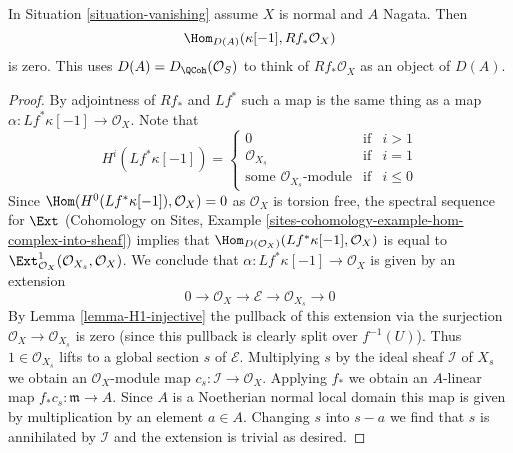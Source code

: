 \begin{lemma}
\label{lemma-R1-injective}
In Situation \ref{situation-vanishing} assume $X$ is normal and $A$ Nagata.
Then
$$
\Hom_{D(A)}(\kappa[-1], Rf_*\mathcal{O}_X)
$$
is zero. This uses $D(A) = D_\QCoh(\mathcal{O}_S)$ to think of
$Rf_*\mathcal{O}_X$ as an object of $D(A)$.
\end{lemma}

\begin{proof}
By adjointness of $Rf_*$ and $Lf^*$ such a map is the same thing
as a map $\alpha : Lf^*\kappa[-1] \to \mathcal{O}_X$. Note that
$$
H^i(Lf^*\kappa[-1]) =
\left\{
\begin{matrix}
0 & \text{if} & i > 1 \\
\mathcal{O}_{X_s} & \text{if} & i = 1 \\
\text{some }\mathcal{O}_{X_s}\text{-module} & \text{if} & i \leq 0
\end{matrix}
\right.
$$
Since $\Hom(H^0(Lf^*\kappa[-1]), \mathcal{O}_X) = 0$ as $\mathcal{O}_X$
is torsion free, the spectral sequence for $\Ext$
(Cohomology on Sites, Example
\ref{sites-cohomology-example-hom-complex-into-sheaf})
implies that
$\Hom_{D(\mathcal{O}_X)}(Lf^*\kappa[-1], \mathcal{O}_X)$ is equal to
$\Ext^1_{\mathcal{O}_X}(\mathcal{O}_{X_s}, \mathcal{O}_X)$.
We conclude that
$\alpha : Lf^*\kappa[-1] \to \mathcal{O}_X$ is given by an extension
$$
0 \to \mathcal{O}_X \to \mathcal{E} \to \mathcal{O}_{X_s} \to 0
$$
By Lemma \ref{lemma-H1-injective} the pullback of this extension
via the surjection $\mathcal{O}_X \to \mathcal{O}_{X_s}$ is zero
(since this pullback is clearly split over $f^{-1}(U)$).
Thus $1 \in \mathcal{O}_{X_s}$ lifts to a global section $s$ of
$\mathcal{E}$. Multiplying $s$ by the ideal sheaf $\mathcal{I}$
of $X_s$ we obtain an $\mathcal{O}_X$-module map
$c_s : \mathcal{I} \to \mathcal{O}_X$. Applying $f_*$ we obtain
an $A$-linear map $f_*c_s : \mathfrak m \to A$. Since $A$ is
a Noetherian normal local domain this map is given by multiplication
by an element $a \in A$. Changing $s$ into $s -  a$ we find that
$s$ is annihilated by $\mathcal{I}$ and the extension is trivial
as desired.
\end{proof}


